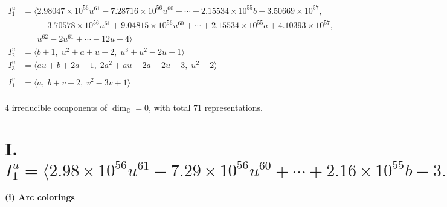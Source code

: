 \documentclass[1p]{elsarticle_modified}
\theoremstyle{definition}
\begin{document}
\begin{align*}
I^u_{1}&=\langle 
2.98047\times10^{56} u^{61}-7.28716\times10^{56} u^{60}+\cdots+2.15534\times10^{55} b-3.50669\times10^{57},\\
\phantom{I^u_{1}}&\phantom{= \langle  }-3.70578\times10^{56} u^{61}+9.04815\times10^{56} u^{60}+\cdots+2.15534\times10^{55} a+4.10393\times10^{57},\\
\phantom{I^u_{1}}&\phantom{= \langle  }u^{62}-2 u^{61}+\cdots-12 u-4\rangle \\
I^u_{2}&=\langle 
b+1,\;u^2+a+u-2,\;u^3+u^2-2 u-1\rangle \\
I^u_{3}&=\langle 
a u+b+2 a-1,\;2 a^2+a u-2 a+2 u-3,\;u^2-2\rangle \\
\\
I^v_{1}&=\langle 
a,\;b+v-2,\;v^2-3 v+1\rangle \\
\end{align*}
\raggedright * 4 irreducible components of $\dim_{\mathbb{C}}=0$, with total 71 representations.\\
\newpage
\renewcommand{\arraystretch}{1}
\centering \section*{I. $I^u_{1}= \langle 2.98\times10^{56} u^{61}-7.29\times10^{56} u^{60}+\cdots+2.16\times10^{55} b-3.51\times10^{57},\;-3.71\times10^{56} u^{61}+9.05\times10^{56} u^{60}+\cdots+2.16\times10^{55} a+4.10\times10^{57},\;u^{62}-2 u^{61}+\cdots-12 u-4 \rangle$}
\flushleft \textbf{(i) Arc colorings}\\
\end{document}

